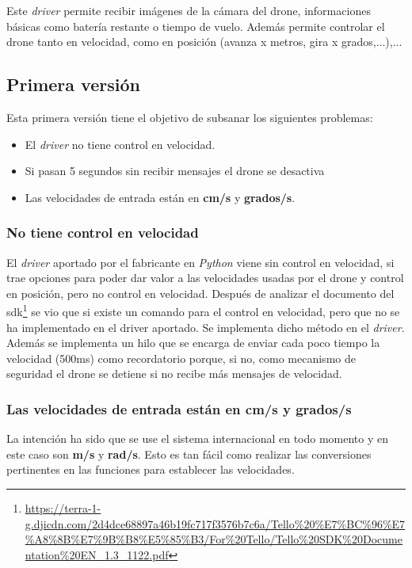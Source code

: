 Este \textit{driver} permite recibir imágenes de la cámara del drone, informaciones básicas como batería restante o tiempo de vuelo. Además permite controlar el drone tanto en velocidad, como en posición (avanza x metros, gira x grados,...),... 
\subsection{Primera versión}
Esta primera versión tiene el objetivo de subsanar los siguientes problemas:
\begin{itemize}
  \item El \textit{driver} no tiene control en velocidad.
  \item Si pasan 5 segundos sin recibir mensajes el drone se desactiva
  \item Las velocidades de entrada están en \textbf{cm/s} y \textbf{grados/s}.
\end{itemize}

\subsubsection*{No tiene control en velocidad}
El \textit{driver} aportado por el fabricante en \textit{Python} viene sin control en velocidad, si trae opciones para poder dar valor a las velocidades usadas por el drone y control en posición, pero no control en velocidad.
Después de analizar el documento del \acrshort{sdk}\footnote{\url{https://terra-1-g.djicdn.com/2d4dce68897a46b19fc717f3576b7c6a/Tello\%20\%E7\%BC\%96\%E7\%A8\%8B\%E7\%9B\%B8\%E5\%85\%B3/For\%20Tello/Tello\%20SDK\%20Documentation\%20EN_1.3_1122.pdf}} se vio que si existe un comando para el control en velocidad, pero que no se ha implementado en el driver aportado. 
Se implementa dicho método en el \textit{driver}. Además se implementa un hilo que se encarga de enviar cada poco tiempo la velocidad (500ms) como recordatorio porque, si no, como mecanismo de seguridad el drone se detiene si no recibe más mensajes de velocidad.

\subsubsection*{Las velocidades de entrada están en \textbf{cm/s} y \textbf{grados/s}}
La intención ha sido que se use el sistema internacional en todo momento y en este caso son \textbf{m/s} y \textbf{rad/s}.
Esto es tan fácil como realizar las conversiones pertinentes en las funciones para establecer las velocidades.

